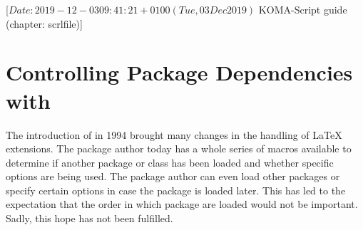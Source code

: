%
%
%
%
%
%
%
%
% 
%
%
%
%

                 [$Date: 2019-12-03 09:41:21 +0100 (Tue, 03 Dec 2019) $
                  KOMA-Script guide (chapter: scrlfile)]


\chapter{Controlling Package Dependencies with }
\BeginIndexGroup
{}

The introduction of \LaTeXe{} in 1994 brought many changes in the handling of
\LaTeX{} extensions. The package author today has a whole series of macros
available to determine if another package or class has been loaded and whether
specific options are being used. The package author can even load other
packages or specify certain options in case the package is loaded later. This
has led to the expectation that the order in which package are loaded would
not be important. Sadly, this hope has not been fulfilled.

